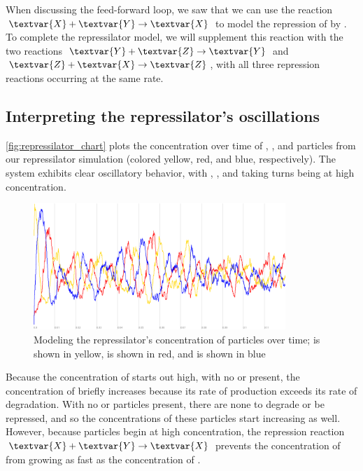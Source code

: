 When discussing the feed-forward loop, we saw that we can use the reaction $\textvar{X} + \textvar{Y} \rightarrow \textvar{X}$ to model the repression of  by . To complete the repressilator model, we will supplement this reaction with the two reactions $\textvar{Y} + \textvar{Z} \rightarrow \textvar{Y}$ and $\textvar{Z} + \textvar{X} \rightarrow \textvar{Z}$, with all three repression reactions occurring at the same rate.

\FloatBarrier
{}
\subsection{Interpreting the repressilator's oscillations}

\autoref{fig:repressilator_chart} plots the concentration over time of , , and  particles from our repressilator simulation (colored yellow, red, and blue, respectively). The system exhibits clear oscillatory behavior, with , , and  taking turns being at high concentration.\\

\begin{qbox}\end{qbox}

\begin{figure}[h]
\centering
\mySfFamily
\includegraphics[width = 0.85\textwidth]{../images/cellblender_repressilator_white.png}
\caption{Modeling the repressilator's concentration of particles over time;  is shown in yellow,  is shown in red, and  is shown in blue}
\label{fig:repressilator_chart}
\end{figure}

Because the concentration of  starts out high, with no  or  present, the concentration of  briefly increases because its rate of production exceeds its rate of degradation. With no  or  particles present, there are none to degrade or be repressed, and so the concentrations of these particles start increasing as well. However, because  particles begin at high concentration, the repression reaction $\textvar{X} + \textvar{Y} \rightarrow \textvar{X}$ prevents the concentration of  from growing as fast as the concentration of .

